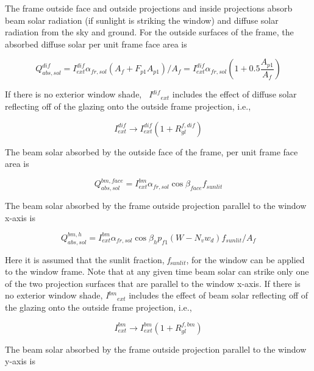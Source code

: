 The frame outside face and outside projections and inside projections absorb beam solar radiation (if sunlight is striking the window) and diffuse solar radiation from the sky and ground. For the outside surfaces of the frame, the absorbed diffuse solar per unit frame face area is

\begin{equation}
Q_{abs,sol}^{dif} = I_{ext}^{dif}{\alpha_{fr,sol}}\left( {{A_f} + {F_{p1}}{A_{p1}}} \right)/{A_f} = I_{ext}^{dif}{\alpha_{fr,sol}}\left( {1 + 0.5\frac{{{A_{p1}}}}{{{A_f}}}} \right)
\end{equation}

If there is no exterior window shade, \emph{~I\(^{dif}\)\(_{ext}\)} includes the effect of diffuse solar reflecting off of the glazing onto the outside frame projection, i.e.,

\begin{equation}
I_{ext}^{dif} \to I_{ext}^{dif}\left( {1 + R_{gl}^{f,dif}} \right)
\end{equation}

The beam solar absorbed by the outside face of the frame, per unit frame face area is

\begin{equation}
Q_{abs,sol}^{bm,face} = I_{ext}^{bm}{\alpha_{fr,sol}}\cos {\beta_{face}}{f_{sunlit}}
\end{equation}

The beam solar absorbed by the frame outside projection parallel to the window x-axis is

\begin{equation}
Q_{abs,sol}^{bm,h} = I_{ext}^{bm}{\alpha_{fr,sol}}\cos {\beta_h}{p_{f1}}\left( {W - {N_v}{w_d}} \right){f_{sunlit}}/{A_f}
\end{equation}

Here it is assumed that the sunlit fraction, \emph{f\(_{sunlit}\)}, for the window can be applied to the window frame. Note that at any given time beam solar can strike only one of the two projection surfaces that are parallel to the window x-axis. If there is no exterior window shade, \emph{I\(^{bm}\)\(_{ext}\)} includes the effect of beam solar reflecting off of the glazing onto the outside frame projection, i.e.,

\begin{equation}
I_{ext}^{bm} \to I_{ext}^{bm}\left( {1 + R_{gl}^{f,bm}} \right)
\end{equation}

The beam solar absorbed by the frame outside projection parallel to the window y-axis is

